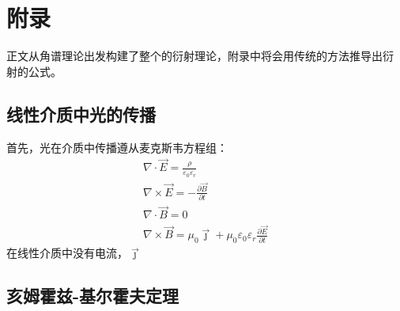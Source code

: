 \documentclass{article}
\begin{document}
\section{附录}
正文从角谱理论出发构建了整个的衍射理论，附录中将会用传统的方法推导出衍
射的公式。
\subsection{线性介质中光的传播}
首先，光在介质中传播遵从麦克斯韦方程组：
\begin{equation}
\label{eq:11}
\begin{array}{l}
  \nabla \cdot \vec{E}=\frac{\rho}{\varepsilon_0\varepsilon_{r}}\\
  \nabla \times \vec{E}=-\frac{\partial \vec{B}}{\partial t}\\
  \nabla \cdot \vec{B}=0\\
  \nabla \times \vec{B}=\mu_0\vec{\jmath}+\mu_0\varepsilon_0\varepsilon_r
  \frac{\partial \vec{E}}{\partial t}
\end{array}
\end{equation}
在线性介质中没有电流，$\vec{\jmath}$
\subsection{亥姆霍兹-基尔霍夫定理}
\end{document}
